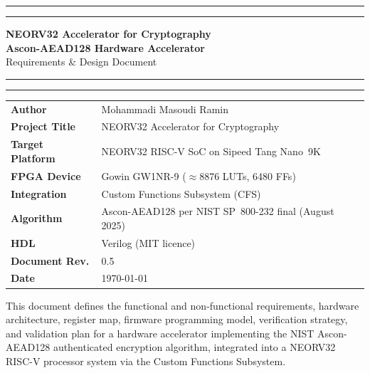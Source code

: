 \documentclass[11pt,a4paper]{article}
\begin{document}

\begin{titlepage}
\centering
\vspace*{1.8cm}
{\color{docblue}\rule{\linewidth}{2pt}}\vspace{6pt}
{\color{docblue}\rule{\linewidth}{0.4pt}}
\vspace{1.5cm}

{\Huge\bfseries\color{docblue} NEORV32 Accelerator for Cryptography}\\[0.6em]
{\LARGE\bfseries\color{docblue} Ascon-AEAD128 Hardware Accelerator}\\[0.5em]
{\Large\color{doclblue} Requirements \& Design Document}

\vspace{1.5cm}
{\color{docblue}\rule{\linewidth}{0.4pt}}\vspace{6pt}
{\color{docblue}\rule{\linewidth}{2pt}}
\vspace{2cm}

\begin{tabular}{@{}ll@{}}
  \toprule
  \textbf{Author}          & Mohammadi Masoudi Ramin \\[2pt]
  \textbf{Project Title}   & NEORV32 Accelerator for Cryptography \\[2pt]
  \textbf{Target Platform} & NEORV32 RISC-V SoC on Sipeed Tang Nano~9K \\[2pt]
  \textbf{FPGA Device}     & Gowin GW1NR-9 ($\approx$8876 LUTs, 6480 FFs) \\[2pt]
  \textbf{Integration}     & Custom Functions Subsystem (CFS) \\[2pt]
  \textbf{Algorithm}       & Ascon-AEAD128 per NIST SP~800-232 final (August 2025) \\[2pt]
  \textbf{HDL}             & Verilog (MIT licence) \\[2pt]
  \textbf{Document Rev.}   & 0.5 \\[2pt]
  \textbf{Date}            & \today \\
  \bottomrule
\end{tabular}

\vspace{2cm}
\begin{tcolorbox}[colback=reqbg, colframe=docblue, arc=4pt, boxrule=0.8pt,
  left=12pt, right=12pt, top=8pt, bottom=8pt]
\small\centering
This document defines the functional and non-functional requirements, hardware
architecture, register map, firmware programming model, verification strategy,
and validation plan for a hardware accelerator implementing the NIST
Ascon-AEAD128 authenticated encryption algorithm, integrated into a NEORV32
RISC-V processor system via the Custom Functions Subsystem.
\end{tcolorbox}
\end{titlepage}
\end{document}
